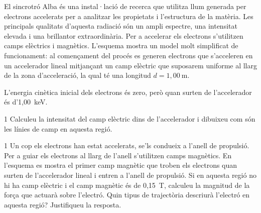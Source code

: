 El sincrotró Alba és una instal·lació de recerca que utilitza llum generada per electrons accelerats per a analitzar les propietats i l'estructura de la matèria. Les principals qualitats d'aquesta radiació són un ampli espectre, una intensitat elevada i una brillantor extraordinària. Per a accelerar els electrons s'utilitzen camps elèctrics i magnètics. L'esquema mostra un model molt simplificat de funcionament: al començament del procés es generen electrons que s'acceleren en un accelerador lineal mitjançant un camp elèctric que suposarem uniforme al llarg de la zona d'acceleració, la qual té una longitud $d = 1,00\ \mathrm{m}$.


L'energia cinètica inicial dels electrons és zero, però quan surten de l'accelerador és d'1,00~keV.

\begin{apartat}{1}
Calculeu la intensitat del camp elèctric dins de l'accelerador i dibuixeu com són les línies de camp en aquesta regió.
\end{apartat}

\begin{apartat}{1}
Un cop els electrons han estat accelerats, se'ls condueix a l'anell de propulsió. Per a guiar els electrons al llarg de l'anell s'utilitzen camps magnètics. En l'esquema es mostra el primer camp magnètic que troben els electrons quan surten de l'accelerador lineal i entren a l'anell de propulsió. Si en aquesta regió no hi ha camp elèctric i el camp magnètic és de 0,15~T, calculeu la magnitud de la força que actuarà sobre l'electró. Quin tipus de trajectòria descriurà l'electró en aquesta regió? Justifiqueu la resposta.
\end{apartat}


